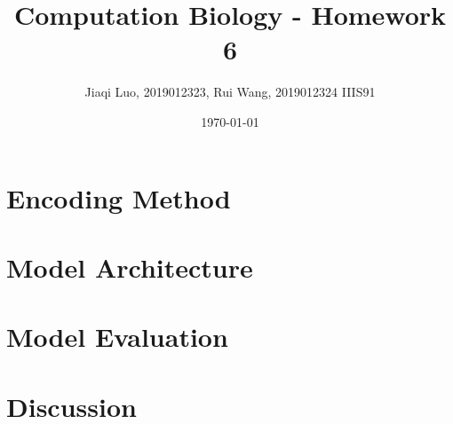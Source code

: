 \documentclass[utf8]{article}
\title{\bf\huge Computation Biology - Homework 6}
\author{Jiaqi Luo, 2019012323, Rui Wang, 2019012324  IIIS91}
\date{\today}
\begin{document}
\maketitle

\section{Encoding Method\cite{jurtz2018nettcr}\cite{nielsen2003reliable}}


\section{Model Architecture}


\section{Model Evaluation}


\section{Discussion}





\end{document}
